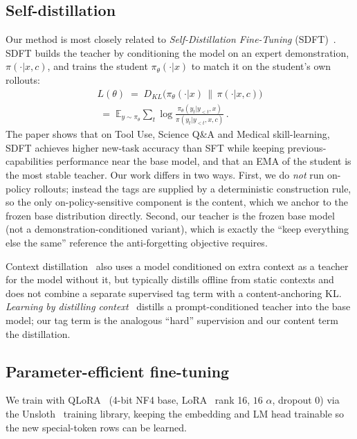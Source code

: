 \documentclass[conference]{IEEEtran}
\begin{document}
\subsection{Self-distillation}
Our method is most closely related to \emph{Self-Distillation Fine-Tuning}
(SDFT)~\cite{selfdistill2026}. SDFT builds the teacher by conditioning the model on
an expert demonstration, $\pi(\cdot|x,c)$, and trains the student $\pi_\theta(\cdot|x)$
to match it on the student's own rollouts:
\begin{equation}
\begin{split}
  L(\theta) \;=\; D_{KL}\big(\pi_\theta(\cdot|x) \,\|\, \pi(\cdot|x,c)\big)\\
  \;=\; \mathbb{E}_{y\sim\pi_\theta}\sum_{t}
      \log\frac{\pi_\theta(y_t|y_{<t},x)}
      {\pi(y_t|y_{<t},x,c)}\,.
\end{split}
\end{equation}
The paper shows that on Tool Use, Science Q\&A and Medical skill-learning, SDFT
achieves higher new-task accuracy than SFT while keeping previous-capabilities
performance near the base model, and that an EMA of the student is the most stable
teacher. Our work differs in two ways. First, we do \emph{not} run on-policy
rollouts; instead the tags are supplied by a deterministic construction rule, so the
only on-policy-sensitive component is the content, which we anchor to the frozen base
distribution directly. Second, our teacher is the frozen base model (not a
demonstration-conditioned variant), which is exactly the ``keep everything else the
same'' reference the anti-forgetting objective requires.

Context distillation~\cite{bai2022,snell2022} also uses a model conditioned on extra
context as a teacher for the model without it, but typically distills offline from
static contexts and does not combine a separate supervised tag term with a
content-anchoring KL. \emph{Learning by distilling context}~\cite{snell2022}
distills a prompt-conditioned teacher into the base model; our tag term is the
analogous ``hard'' supervision and our content term the distillation.

\subsection{Parameter-efficient fine-tuning}
We train with QLoRA~\cite{qlora2023} (4-bit NF4 base, LoRA~\cite{lora2022} rank 16,
$16$ $\alpha$, dropout 0) via the Unsloth~\cite{unsloth} training library, keeping the
embedding and LM head trainable so the new special-token rows can be learned.
\end{document}
